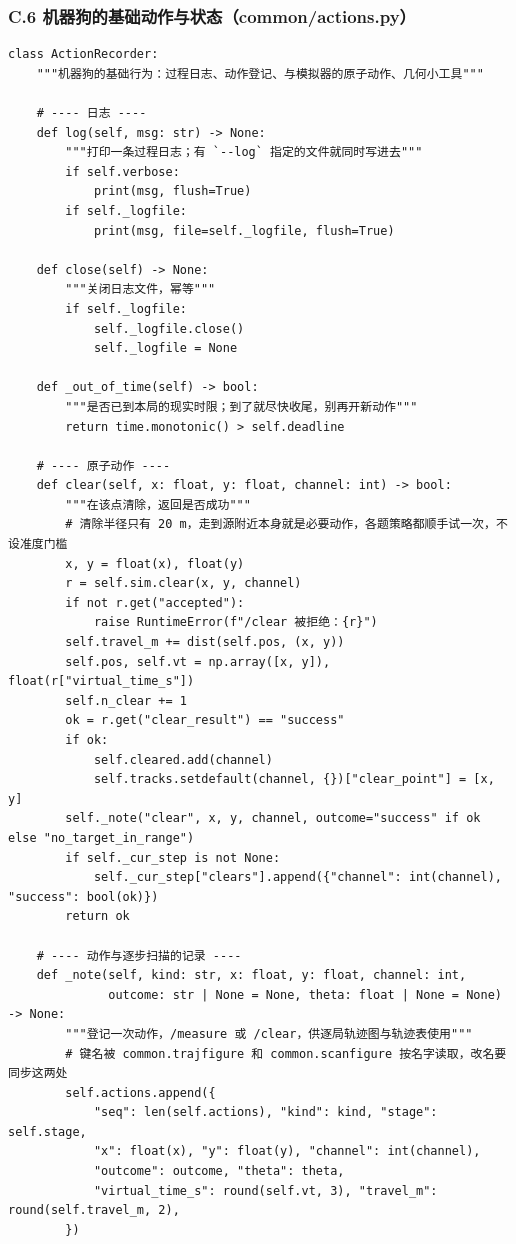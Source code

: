 \documentclass[UTF8, zihao=5,AutoFakeBold=2]{ctexart}
\begin{document}
	\subsubsection*{C.6 \quad 机器狗的基础动作与状态（common/actions.py）}
	\begin{lstlisting}
class ActionRecorder:
    """机器狗的基础行为：过程日志、动作登记、与模拟器的原子动作、几何小工具"""

    # ---- 日志 ----
    def log(self, msg: str) -> None:
        """打印一条过程日志；有 `--log` 指定的文件就同时写进去"""
        if self.verbose:
            print(msg, flush=True)
        if self._logfile:
            print(msg, file=self._logfile, flush=True)

    def close(self) -> None:
        """关闭日志文件，幂等"""
        if self._logfile:
            self._logfile.close()
            self._logfile = None

    def _out_of_time(self) -> bool:
        """是否已到本局的现实时限；到了就尽快收尾，别再开新动作"""
        return time.monotonic() > self.deadline

    # ---- 原子动作 ----
    def clear(self, x: float, y: float, channel: int) -> bool:
        """在该点清除，返回是否成功"""
        # 清除半径只有 20 m，走到源附近本身就是必要动作，各题策略都顺手试一次，不设准度门槛
        x, y = float(x), float(y)
        r = self.sim.clear(x, y, channel)
        if not r.get("accepted"):
            raise RuntimeError(f"/clear 被拒绝：{r}")
        self.travel_m += dist(self.pos, (x, y))
        self.pos, self.vt = np.array([x, y]), float(r["virtual_time_s"])
        self.n_clear += 1
        ok = r.get("clear_result") == "success"
        if ok:
            self.cleared.add(channel)
            self.tracks.setdefault(channel, {})["clear_point"] = [x, y]
        self._note("clear", x, y, channel, outcome="success" if ok else "no_target_in_range")
        if self._cur_step is not None:
            self._cur_step["clears"].append({"channel": int(channel), "success": bool(ok)})
        return ok

    # ---- 动作与逐步扫描的记录 ----
    def _note(self, kind: str, x: float, y: float, channel: int,
              outcome: str | None = None, theta: float | None = None) -> None:
        """登记一次动作，/measure 或 /clear，供逐局轨迹图与轨迹表使用"""
        # 键名被 common.trajfigure 和 common.scanfigure 按名字读取，改名要同步这两处
        self.actions.append({
            "seq": len(self.actions), "kind": kind, "stage": self.stage,
            "x": float(x), "y": float(y), "channel": int(channel),
            "outcome": outcome, "theta": theta,
            "virtual_time_s": round(self.vt, 3), "travel_m": round(self.travel_m, 2),
        })


\end{lstlisting}
\end{document}
